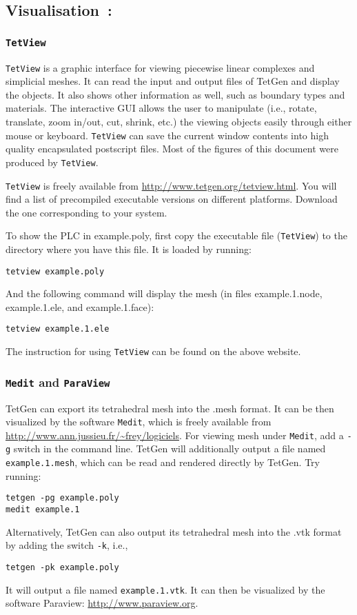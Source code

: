 \documentclass[12pt,twoside,a4paper]{article}
\numberwithin{equation}{section}
\newcommand{\tetg}{\texttt{-g}}
\newcommand{\tetk}{\texttt{-k}}
\begin{document}
\subsection[Visualisation]
{Visualisation~\cite[p. 30]{Si2013}:}

\newcommand{\tetview}{\texttt{TetView}}
\newcommand{\medit}{\texttt{\texttt{Medit}}}
\newcommand{\paraview}{\texttt{ParaView}}

\subsubsection[\tetview{}]{\tetview{}}
\tetview{} is a graphic interface for viewing piecewise linear complexes and
simplicial meshes. It can read the input and output files of TetGen and
display the objects. It also shows other information as well, such as
boundary types and materials. The interactive GUI allows the user to
manipulate (i.e., rotate, translate, zoom in/out, cut, shrink, etc.) the
viewing objects easily through either mouse or keyboard. \tetview{} can save
the current window contents into high quality encapsulated postscript files.
Most of the figures of this document were produced by \tetview{}.

\tetview{} is freely available from
\url{http://www.tetgen.org/tetview.html}.  You will find a list of
precompiled executable versions on different platforms.  Download the one
corresponding to your system.  

To show the PLC in example.poly, first copy the executable file (\tetview{})
to the directory where you have this file. It is loaded by running: 
\begin{lstlisting}[numbers=none]
tetview example.poly
\end{lstlisting} 
And the following
command will display the mesh (in files example.1.node, example.1.ele, and
example.1.face): 
\begin{lstlisting}[numbers=none]
tetview example.1.ele 
\end{lstlisting} 
The instruction for using \tetview{} can
be found on the above website.
\subsubsection[\medit{} and \paraview{}]
{\medit{} and \paraview{}}
TetGen can export its tetrahedral mesh into the .mesh format. It can be then
visualized by the software \medit{}, which is freely available from
\url{http://www.ann.jussieu.fr/~frey/logiciels}.  For viewing mesh under
\medit{}, add a \tetg{} switch in the command line.  TetGen will
additionally output a file named \texttt{example.1.mesh}, which can be read
and rendered directly by TetGen. Try running:
\begin{lstlisting}[numbers=none]
tetgen -pg example.poly 
medit example.1
\end{lstlisting} 
Alternatively, TetGen can also output its tetrahedral mesh into the .vtk
format by adding the switch \tetk{}, i.e.,
\begin{lstlisting}[numbers=none]
tetgen -pk example.poly
\end{lstlisting} 
It will output a file named \texttt{example.1.vtk}. It can then be
visualized by the software Paraview: \url{http://www.paraview.org}.
\end{document}
